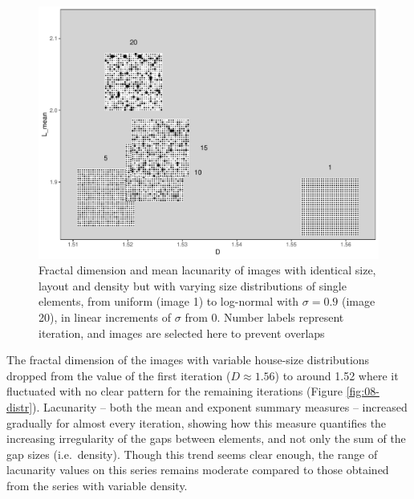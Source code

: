 \documentclass[
  12pt,
  a4paper, twoside]{book}
\begin{document}
\begin{figure}

{\centering \includegraphics[width=0.9\linewidth]{Results/fig08_distr_im} 

}

\caption[Effect of size distribution of elements on D and L]{Fractal dimension and mean lacunarity of images with identical size, layout and density but with varying size distributions of single elements, from uniform (image 1) to log-normal with \(\sigma = 0.9\) (image 20), in linear increments of \(\sigma\) from 0. Number labels represent iteration, and images are selected here to prevent overlaps}\label{fig:08-distr-im}
\end{figure}

The fractal dimension of the images with variable house-size distributions dropped from the value of the first iteration (\(D \approx 1.56\)) to around 1.52 where it fluctuated with no clear pattern for the remaining iterations (Figure \ref{fig:08-distr}). Lacunarity -- both the mean and exponent summary measures -- increased gradually for almost every iteration, showing how this measure quantifies the increasing irregularity of the gaps between elements, and not only the sum of the gap sizes (i.e.~density). Though this trend seems clear enough, the range of lacunarity values on this series remains moderate compared to those obtained from the series with variable density.
\end{document}
